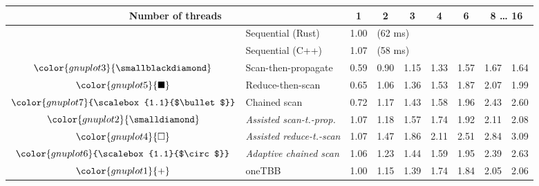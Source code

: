 \begin{tabular}{clrrrrrrr}
\toprule
\multicolumn{2}{c}{\textbf{Number of threads}} & \multicolumn{1}{c}{\textbf{ 1 }} & \multicolumn{1}{c}{\textbf{ 2 }} & \multicolumn{1}{c}{\textbf{ 3 }} & \multicolumn{1}{c}{\textbf{ 4 }} & \multicolumn{1}{c}{\textbf{ 6 }} & \multicolumn{2}{c}{\textbf{ 8 } \dots \textbf{ 16 }} \\
\midrule
& Sequential (Rust) & \multicolumn{1}{r}{ 1.00 } & \multicolumn{ 6 }{l}{(62 ms)} \\
& Sequential (C++) & \multicolumn{1}{r}{ 1.07 } & \multicolumn{ 6 }{l}{(58 ms)} \\
\rowcolor{gnuplot3!10}$\color{gnuplot3}{\smallblackdiamond}$ & Scan-then-propagate & \cellcolor{gnuplot3!10} 0.59 & \cellcolor{gnuplot3!10} 0.90 & \cellcolor{gnuplot3!10} 1.15 & \cellcolor{gnuplot3!10} 1.33 & \cellcolor{gnuplot3!10} 1.57 & \cellcolor{gnuplot3!10} 1.67 & \cellcolor{gnuplot3!10} 1.64 \\
\rowcolor{gnuplot5!10}$\color{gnuplot5}{\blacksquare}$ & Reduce-then-scan & \cellcolor{gnuplot5!10} 0.65 & \cellcolor{gnuplot5!10} 1.06 & \cellcolor{gnuplot5!10} 1.36 & \cellcolor{gnuplot5!10} 1.53 & \cellcolor{gnuplot5!10} 1.87 & \cellcolor{gnuplot5!10} 2.07 & \cellcolor{gnuplot5!10} 1.99 \\
\rowcolor{gnuplot7!10}$\color{gnuplot7}{\scalebox{1.1}{$\bullet$}}$ & Chained scan & \cellcolor{gnuplot7!10} 0.72 & \cellcolor{gnuplot7!10} 1.17 & \cellcolor{gnuplot7!10} 1.43 & \cellcolor{gnuplot7!10} 1.58 & \cellcolor{gnuplot7!10} 1.96 & \cellcolor{gnuplot7!10} 2.43 & \cellcolor{gnuplot7!10} 2.60 \\
\rowcolor{gnuplot2!30}$\color{gnuplot2}{\smalldiamond}$ & \textit{Assisted scan-t.-prop.} & \cellcolor{gnuplot2!30} 1.07 & \cellcolor{gnuplot2!30} 1.18 & \cellcolor{gnuplot2!30} 1.57 & \cellcolor{gnuplot2!30} 1.74 & \cellcolor{gnuplot2!30} 1.92 & \cellcolor{gnuplot2!30} 2.11 & \cellcolor{gnuplot2!30} 2.08 \\
\rowcolor{gnuplot4!30}$\color{gnuplot4}{\square}$ & \textit{Assisted reduce-t.-scan} & \cellcolor{gnuplot4!30} 1.07 & \cellcolor{gnuplot4!30} 1.47 & \cellcolor{gnuplot4!30} 1.86 & \cellcolor{gnuplot4!30} 2.11 & \cellcolor{gnuplot4!30} 2.51 & \cellcolor{gnuplot4!30} 2.84 & \cellcolor{gnuplot4!30} 3.09 \\
\rowcolor{gnuplot6!30}$\color{gnuplot6}{\scalebox{1.1}{$\circ$}}$ & \textit{Adaptive chained scan} & \cellcolor{gnuplot6!30} 1.06 & \cellcolor{gnuplot6!30} 1.23 & \cellcolor{gnuplot6!30} 1.44 & \cellcolor{gnuplot6!30} 1.59 & \cellcolor{gnuplot6!30} 1.95 & \cellcolor{gnuplot6!30} 2.39 & \cellcolor{gnuplot6!30} 2.63 \\
\rowcolor{gnuplot1!10}$\color{gnuplot1}{+}$ & oneTBB & \cellcolor{gnuplot1!10} 1.00 & \cellcolor{gnuplot1!10} 1.15 & \cellcolor{gnuplot1!10} 1.39 & \cellcolor{gnuplot1!10} 1.74 & \cellcolor{gnuplot1!10} 1.84 & \cellcolor{gnuplot1!10} 2.05 & \cellcolor{gnuplot1!10} 2.06 \\
\bottomrule
\end{tabular}
